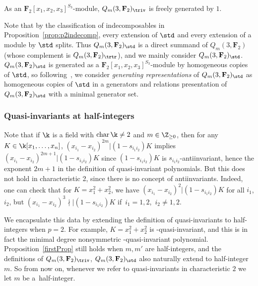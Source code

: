 \begin{Proposition}\label{prop:p2triv}
 As an $\mathbf{F}_2[x_1,x_2,x_3]^{S_3}$-module, $Q_m(3,\mathbf{F}_2)_{\triv}$ is freely generated by $1$.
\end{Proposition}

Note that by the classification of indecomposables in Proposition~\ref{prop:p2indecomp}, every extension of $\std$ and every extension of a module by $\std$ splits. Thus $Q_m(3,\mathbf{F}_2)_\std$ is a direct summand of $Q_m(3,\mathbf{F}_2)$ (whose complement is $Q_m(3,\mathbf{F}_2)_\trtr$), and we mainly consider $Q_m(3,\mathbf{F}_2)_\std$. $Q_m(3,\mathbf{F}_2)_{\std}$ is generated as a $\mathbf{F}_2[x_1,x_2,x_3]^{S_3}$-module by homogeneous copies of $\std$, so following~\cite{wang2022explicit}, we consider \textit{generating representations} of $Q_m(3,\mathbf{F}_2)_\std$ as homogeneous copies of $\std$ in a generators and relations presentation of $Q_m(3,\mathbf{F}_2)_{\std}$ with a minimal generator set.

\subsubsection{Quasi-invariants at half-integers}

Note that if $\k$ is a field with $\mathrm{char\,}\k\neq 2$ and $m\in\Z_{\geq 0}$, then for any $K\in\k[x_1,\dots,x_n]$, $(x_{i_1}-x_{i_2})^{2m}|(1-s_{i_1i_2})K$ implies $(x_{i_1}-x_{i_2})^{2m+1}|(1-s_{i_1i_2})K$ since $(1-s_{i_1i_2})K$ is $s_{i_1i_2}$-antiinvariant, hence the exponent $2m+1$ in the definition of quasi-invariant polynomials. But this does not hold in characteristic 2, since there is no concept of antiinvariants. Indeed, one can check that for $K=x_1^2+x_2^2$, we have $(x_{i_1}-x_{i_2})^2|(1-s_{i_1i_2})K$ for all $i_1$, $i_2$, but $(x_{i_1}-x_{i_2})^3\nmid|(1-s_{i_1i_2})K$ if~$i_1=1,2$,~$i_2\neq 1,2$.

We encapsulate this data by extending the definition of quasi-invariants to half-integers when ${p=2}$. For example, $K=x_1^2+x_2^2$ is -quasi-invariant, and this is in fact the minimal degree nonsymmetric -quasi-invariant polynomial. Proposition~\ref{firstProp} still holds when $m,m'$ are half-integers, and the definitions of $Q_m(3,\mathbf{F}_2)_\triv$, $Q_m(3,\mathbf{F}_2)_\std$ also naturally extend to half-integer~$m$. So from now on, whenever we refer to quasi-invariants in characteristic $2$ we let $m$ be a~half-integer.


